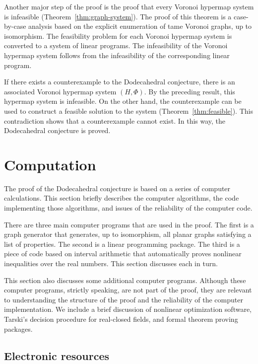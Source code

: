 \documentclass{article} %
\begin{document}
Another major step of the proof is the proof that every Voronoi
hypermap system is infeasible (Theorem~\ref{thm:graph-system}). The
proof of this theorem is a case-by-case analysis based on the explicit
enumeration of tame Voronoi graphs, up to isomorphism. The feasibility
problem for each Voronoi hypermap system is converted to a system of
linear programs. The infeasibility of the Voronoi hypermap system
follows from the infeasibility of the corresponding linear program.

If there exists a counterexample to the Dodecahedral conjecture, there
is an associated Voronoi hypermap system $(H,\Phi)$. By the preceding
result, this hypermap system is infeasible. On the other hand, the
counterexample can be used to construct a feasible solution to the
system (Theorem~\ref{thm:feasible}). This contradiction shows that a
counterexample cannot exist. In this way, the Dodecahedral conjecture
is proved.

\section{Computation}

The proof of the Dodecahedral conjecture is based on a series of
computer calculations. This section briefly describes the computer
algorithms, the code implementing those algorithms, and issues of the
reliability of the computer code.

There are three main computer programs that are used in the proof. The
first is a graph generator that generates, up to isomorphism, all
planar graphs satisfying a list of properties. The second is a linear
programming package. The third is a piece of code based on interval
arithmetic that automatically proves nonlinear inequalities over the
real numbers. This section discusses each in turn.

This section also discusses some additional computer programs.
Although these computer programs, strictly speaking, are not part of
the proof, they are relevant to understanding the structure of the
proof and the reliability of the computer implementation. 
We include a brief discussion of nonlinear optimization software,
Tarski's decision procedure for real-closed fields, and formal theorem
proving packages.

\subsection{Electronic resources}
\end{document}
